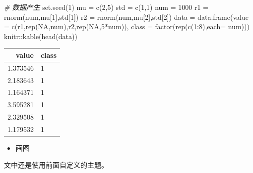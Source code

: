 \documentclass[
]{book}
\newenvironment{Shaded}{\begin{snugshade}}{\end{snugshade}}
\newcommand{\AttributeTok}[1]{\textcolor[rgb]{0.77,0.63,0.00}{#1}}
\newcommand{\CommentTok}[1]{\textcolor[rgb]{0.56,0.35,0.01}{\textit{#1}}}
\newcommand{\ConstantTok}[1]{\textcolor[rgb]{0.00,0.00,0.00}{#1}}
\newcommand{\DecValTok}[1]{\textcolor[rgb]{0.00,0.00,0.81}{#1}}
\newcommand{\FunctionTok}[1]{\textcolor[rgb]{0.00,0.00,0.00}{#1}}
\newcommand{\NormalTok}[1]{#1}
\newcommand{\OtherTok}[1]{\textcolor[rgb]{0.56,0.35,0.01}{#1}}
\newcommand{\SpecialCharTok}[1]{\textcolor[rgb]{0.00,0.00,0.00}{#1}}
\newcommand{\StringTok}[1]{\textcolor[rgb]{0.31,0.60,0.02}{#1}}
\providecommand{\tightlist}{%
  \setlength{\itemsep}{0pt}\setlength{\parskip}{0pt}}
\begin{document}
\begin{Shaded}
\begin{Highlighting}[]
\CommentTok{\# 数据产生}
\FunctionTok{set.seed}\NormalTok{(}\DecValTok{1}\NormalTok{)}
\NormalTok{mu }\OtherTok{=} \FunctionTok{c}\NormalTok{(}\DecValTok{2}\NormalTok{,}\DecValTok{5}\NormalTok{)}
\NormalTok{std }\OtherTok{=} \FunctionTok{c}\NormalTok{(}\DecValTok{1}\NormalTok{,}\DecValTok{1}\NormalTok{)}
\NormalTok{num }\OtherTok{=} \DecValTok{1000}
\NormalTok{r1 }\OtherTok{=} \FunctionTok{rnorm}\NormalTok{(num,mu[}\DecValTok{1}\NormalTok{],std[}\DecValTok{1}\NormalTok{])}
\NormalTok{r2 }\OtherTok{=} \FunctionTok{rnorm}\NormalTok{(num,mu[}\DecValTok{2}\NormalTok{],std[}\DecValTok{2}\NormalTok{])}
\NormalTok{data }\OtherTok{=} \FunctionTok{data.frame}\NormalTok{(}\StringTok{\textquotesingle{}value\textquotesingle{}} \OtherTok{=} \FunctionTok{c}\NormalTok{(r1,}\FunctionTok{rep}\NormalTok{(}\ConstantTok{NA}\NormalTok{,num),r2,}\FunctionTok{rep}\NormalTok{(}\ConstantTok{NA}\NormalTok{,}\DecValTok{5}\SpecialCharTok{*}\NormalTok{num)),}
                  \StringTok{\textquotesingle{}class\textquotesingle{}} \OtherTok{=} \FunctionTok{factor}\NormalTok{(}\FunctionTok{rep}\NormalTok{(}\FunctionTok{c}\NormalTok{(}\DecValTok{1}\SpecialCharTok{:}\DecValTok{8}\NormalTok{),}\AttributeTok{each=}\NormalTok{ num)))}
\NormalTok{knitr}\SpecialCharTok{::}\FunctionTok{kable}\NormalTok{(}\FunctionTok{head}\NormalTok{(data))}
\end{Highlighting}
\end{Shaded}

\begin{tabular}{r|l}
\hline
value & class\\
\hline
1.373546 & 1\\
\hline
2.183643 & 1\\
\hline
1.164371 & 1\\
\hline
3.595281 & 1\\
\hline
2.329508 & 1\\
\hline
1.179532 & 1\\
\hline
\end{tabular}

\begin{itemize}
\tightlist
\item
  画图
\end{itemize}

文中还是使用前面自定义的主题。
\end{document}

